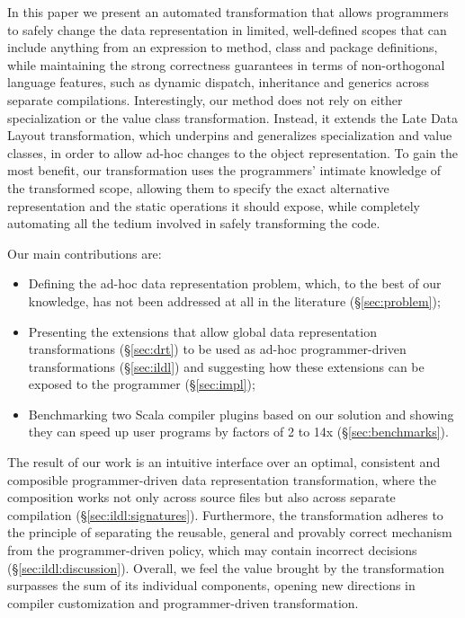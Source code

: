 In this paper we present an automated transformation that allows programmers to safely change the data representation in limited, well-defined scopes that can include anything from an expression to method, class and package definitions, while maintaining the strong correctness guarantees in terms of non-orthogonal language features, such as dynamic dispatch, inheritance and generics across separate compilations. Interestingly, our method does not rely on either specialization or the value class transformation. Instead, it extends the Late Data Layout transformation, which underpins and generalizes specialization and value classes, in order to allow ad-hoc changes to the object representation. To gain the most benefit, our transformation uses the programmers' intimate knowledge of the transformed scope, allowing them to specify the exact alternative representation and the static operations it should expose, while completely automating all the tedium involved in safely transforming the code.

Our main contributions are:
\begin{itemize}
  \item Defining the ad-hoc data representation problem, which, to the best of our knowledge, has not been addressed at all in the literature (\S\ref{sec:problem});
  \item Presenting the extensions that allow global data representation transformations (\S\ref{sec:drt}) to be used as ad-hoc programmer-driven transformations (\S\ref{sec:ildl}) and suggesting how these extensions can be exposed to the programmer (\S\ref{sec:impl});
  \item Benchmarking two Scala compiler plugins based on our solution and showing they can speed up user programs by factors of 2 to 14x (\S\ref{sec:benchmarks}).
\end{itemize}

The result of our work is an intuitive interface over an optimal, consistent and composible programmer-driven data representation transformation, where the composition works not only across source files but also across separate compilation (\S\ref{sec:ildl:signatures}). Furthermore, the transformation adheres to the principle of separating the reusable, general and provably correct mechanism from the programmer-driven policy, which may contain incorrect decisions \cite{lampson-mechanism-policy} (\S\ref{sec:ildl:discussion}). Overall, we feel the value brought by the transformation surpasses the sum of its individual components, opening new directions in compiler customization and programmer-driven transformation.

